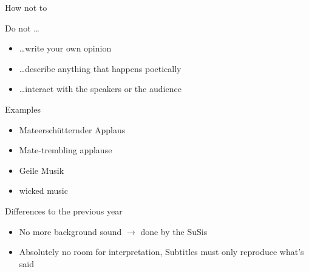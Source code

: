 \documentclass[utf8,widescreen]{beamer}
\begin{document}
\begin{frame}{How not to}
\pause
\begin{block}{Do not \dots}
\begin{itemize}\itemsep 10pt
\item{\dots write your own opinion}
\pause
\item{\dots describe anything that happens poetically}
\pause
\item{\dots interact with the speakers or the audience}
\end{itemize}
\pause
\end{block}
\begin{block}{Examples}
\begin{itemize}\itemsep 10pt
\item{Mateerschütternder Applaus}
\item{Mate-trembling applause}
\pause
\item{Geile Musik}
\item{wicked music}
\end{itemize}
\end{block}
\end{frame}

\begin{frame}{Differences to the previous year}
\pause
\begin{block}{}
\begin{itemize}\itemsep 14pt
\item{No more background sound $\rightarrow$ done by the SuSis}
\pause
\item{Absolutely no room for interpretation, Subtitles must only reproduce what's said}
\end{itemize}
\end{block}
\end{frame}
\end{document}
